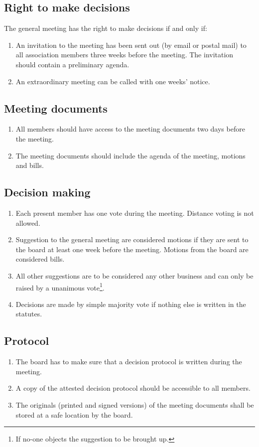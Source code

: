 \subsection{Right to make decisions}
The general meeting has the right to make decisions if and only if:
\begin{enumerate}
  \item An invitation to the meeting has been sent out (by email or postal mail) to all association members three weeks before the meeting. The invitation should contain a preliminary agenda.
  \item An extraordinary meeting can be called with one weeks’ notice. 
\end{enumerate}
\subsection{Meeting documents} \label{sec:regMeetingDocs}
\begin{enumerate}
  \item All members should have access to the meeting documents two days before the meeting. 
  \item The meeting documents should include the agenda of the meeting, motions and bills.
\end{enumerate}
\subsection{Decision making}
\begin{enumerate}
  \item Each present member has one vote during the meeting. Distance voting is not allowed.
  \item Suggestion to the general meeting are considered motions if they are sent to the board at least one week before the meeting. Motions from the board are considered bills.
  \item All other suggestions are to be considered any other business and can only be raised by a unanimous vote\footnote{If no-one objects the suggestion to be brought up.}.
  \item Decisions are made by simple majority vote if nothing else is written in the statutes. 
\end{enumerate}
\subsection{Protocol}
\begin{enumerate}
  \item The board has to make sure that a decision protocol is written during the meeting.
  \item A copy of the attested decision protocol should be accessible to all members.
  \item The originals (printed and signed versions) of the meeting documents shall be stored at a safe location by the board. 
\end{enumerate}

